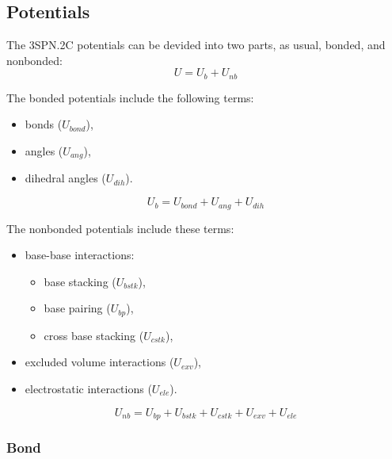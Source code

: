 \subsection{Potentials}
\label{subsec:dna_3spn2c_potential}

The 3SPN.2C potentials can be devided into two parts, as usual, bonded, and
nonbonded:
\begin{displaymath}
  U = U_b + U_{nb}
\end{displaymath}

The bonded potentials include the following terms:
\begin{itemize}
\item bonds ($U_{bond}$),
\item angles ($U_{ang}$),
\item dihedral angles ($U_{dih}$).
\end{itemize}
\begin{equation}
  \label{eq:dna_3spn2c_local}
  U_b = U_{bond} + U_{ang} + U_{dih}
\end{equation}

The nonbonded potentials include these terms:
\begin{itemize}
\item base-base interactions:
  \begin{itemize}
  \item base stacking ($U_{bstk}$),
  \item base pairing ($U_{bp}$),
  \item cross base stacking ($U_{cstk}$),
  \end{itemize}
\item excluded volume interactions ($U_{exv}$),
\item electrostatic interactions ($U_{ele}$).
\end{itemize}
\begin{equation}
  \label{eq:dna_3spn2c_nonlocal}
  U_{nb} = U_{bp} + U_{bstk} + U_{cstk} + U_{exv} + U_{ele}
\end{equation}


\subsubsection{Bond}
\label{sec:dna_3spn2c_potential_bond}

